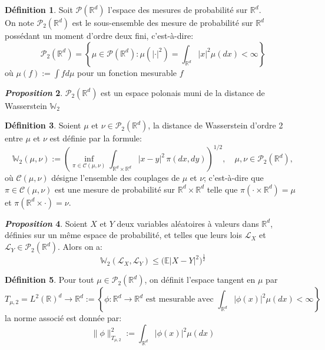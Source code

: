 \documentclass[12pt,a4paper,twoside]{book}%
\theoremstyle{definition}
\newtheorem{dfn}{Définition}[section]
\newtheorem{prop}[dfn]{\textit{Proposition}}
\numberwithin{equation}{section}
\begin{document}
\begin{dfn}
	Soit $\mathcal{P}(\mathbb{R}^d)$ l'espace des mesures de probabilité sur $\mathbb{R}^d$.\\
	On note $\mathcal{P}_2(\mathbb{R}^d)$ est le sous-ensemble des mesure de probabilité sur $\mathbb{R}^d$ possédant un moment d'ordre deux fini, c'est-à-dire:
	\[
	\mathcal{P}_2(\mathbb{R}^d) = \left\{ \mu \in\mathcal{P}(\mathbb{R}^d): \mu(|\cdot|^2) = \int_{\mathbb{R}^d} |x|^2\mu(dx)<\infty
	\right\} 
	\]
	où $\mu(f):=\int fd\mu$ pour un fonction mesurable $f$
\end{dfn}
\begin{prop}
	$\mathcal{P}_2(\mathbb{R}^d)$ est un espace polonais muni de la distance de Wasserstein $\mathbb{W}_2$
\end{prop}
\begin{dfn}
		Soient $\mu$ et $\nu\in\mathcal{P}_2(\mathbb{R}^d)$, la distance de Wasserstein d'ordre 2 entre $\mu$ et $\nu$ est définie par la formule:
	\[
	\mathbb{W}_2(\mu, \nu) := \left( \inf_{\pi \in \mathcal{C}(\mu, \nu)} \int_{\mathbb{R}^d \times \mathbb{R}^d} |x - y|^2 \, \pi(dx, dy) \right)^{1/2}, 
	\quad \mu, \nu \in \mathcal{P}_2(\mathbb{R}^d),
	\]
	où $\mathcal{C}(\mu,\nu)$ désigne l'ensemble des couplages de $\mu$ et $\nu$; c'est-à-dire que $\pi\in\mathcal{C}(\mu,\nu)$ est une mesure de probabilité sur $\mathbb{R}^d\times\mathbb{R}^d$ telle que $\pi(\cdot\times\mathbb{R}^d) = \mu$ et $\pi(\mathbb{R}^d\times\cdot)=\nu$.
\end{dfn}
\begin{prop}
Soient $X$ et $Y$ deux variables aléatoires à valeurs dans $\mathbb{R}^d$, définies sur un même espace de probabilité, et telles que leurs lois $\mathcal{L}_X$ et $\mathcal{L}_Y \in\mathcal{P}_2(\mathbb{R}^d)$. Alors on a:
\[
\mathbb{W}_2(\mathcal{L}_X,\mathcal{L}_Y)\leq\big(\mathbb{E}|X-Y|^2\big)^{\frac{1}{2}}
\]
\end{prop}
\begin{dfn}
	Pour tout $\mu\in\mathcal{P}_2(\mathbb{R}^d)$, on définit l'espace tangent en $\mu$ par
	\[
	T_{\mu,2} = L^2(\mathbb{R})^d\longrightarrow \mathbb{R}^d :=\left\{\phi:\mathbb{R}^d\longrightarrow\mathbb{R}^d \text{ est mesurable avec }\int_{\mathbb{R}^d}|\phi(x)|^2\mu(dx)<\infty\right\}
	\]
	la norme associé est donnée par:
	\[
	\|\phi\|^2_{T_{\mu,2}}:=\int_{\mathbb{R}^d}|\phi(x)|^2\mu(dx)\] 
\end{dfn}
\end{document}
